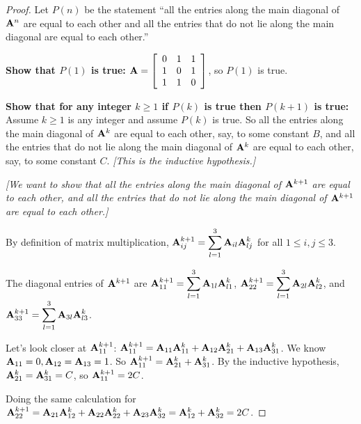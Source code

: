 \documentclass[14pt]{extarticle}
\newcommand{\dps}{\displaystyle}
\begin{document}
\begin{proof}
Let \(P(n)\) be the statement ``all the entries along the main diagonal of \({\bf A}^n\) are equal to each other and all the 
entries that do not lie along the main diagonal are equal to each other.''

{\bf Show that \(P(1)\) is true:}
\({\bf A} = 
\left[ 
\begin{array}{rrr}
0 & 1 & 1 \\
1 & 0 & 1 \\
1 & 1 & 0 \\
\end{array}
\right]
\), so \(P(1)\) is true.

{\bf Show that for any integer \(k \geq 1\) if \(P(k)\) is true then \(P(k+1)\) is true:} Assume \(k \geq 1\) is any
integer and assume \(P(k)\) is true. So all the entries along the main diagonal of \({\bf A}^k\) are equal to each other, 
say, to some constant \(B\), and all the entries that do not lie along the main diagonal of  \({\bf A}^k\) are equal to 
each other, say, to some constant \(C\). {\it [This is the inductive hypothesis.]}

{\it [We want to show that all the entries along the main diagonal of \({\bf A}^{k+1}\) are equal to each other, and 
all the entries that do not lie along the main diagonal of \({\bf A}^{k+1}\) are equal to each other.]} 

By definition of matrix multiplication, \(\dps {\bf A}^{k+1}_{ij} = \sum_{l=1}^{3} {\bf A}_{il} {\bf A}^k_{lj}\) for all 
\(1 \leq i, j \leq 3\). 

The diagonal entries of \({\bf A}^{k+1}\) are \(\dps {\bf A}^{k+1}_{11} = \sum_{l=1}^{3} {\bf A}_{1l} {\bf A}^k_{l1}\), 
\(\dps {\bf A}^{k+1}_{22} = \sum_{l=1}^{3} {\bf A}_{2l} {\bf A}^k_{l2}\), and \\ \(\dps {\bf A}^{k+1}_{33} = \sum_{l=1}^{3} 
{\bf A}_{3l} {\bf A}^k_{l3}\). 

Let's look closer at \({\bf A}^{k+1}_{11}\): \({\bf A}^{k+1}_{11} = {\bf A}_{11} {\bf A}^k_{11} + {\bf A}_{12} {\bf A}
^k_{21} + {\bf A}_{13} {\bf A}^k_{31}\). We know \({\bf A}_{11} = 0, {\bf A}_{12} = {\bf A}_{13} = 1\). So \({\bf A}
^{k+1}_{11} = {\bf A}^k_{21} + {\bf A}^k_{31}\). By the inductive hypothesis, \({\bf A}^k_{21} = {\bf A}^k_{31} = C\), 
so \({\bf A}^{k+1}_{11} = 2C\).

Doing the same calculation for \({\bf A}^{k+1}_{22} = {\bf A}_{21} {\bf A}^k_{12} + {\bf A}_{22} {\bf A}^k_{22} + {\bf A}
_{23} {\bf A}^k_{32} = {\bf A}^k_{12} + {\bf A}^k_{32} = 2C\).


\end{proof}
\end{document}
